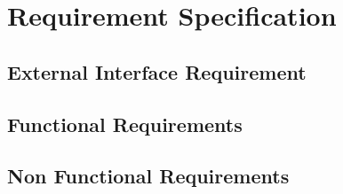 \chapter{Requirement Specification} \label{cap:cap3}
\section{External Interface Requirement}
\section{Functional Requirements}
\section{Non Functional Requirements}

